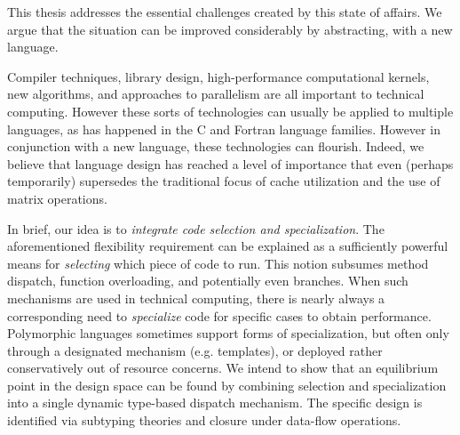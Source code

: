 

This thesis addresses the essential challenges created by
this state of affairs.
We argue that the situation   
can be improved considerably by
abstracting, with a new language.

Compiler techniques, library design, high-performance
computational kernels, new algorithms, and approaches to parallelism are
all important to technical computing.
However these sorts of technologies can usually be applied to multiple
languages, as has happened in the C and Fortran language families.
However in conjunction with a new language, these technologies can flourish.
Indeed, we believe that language design
has reached a level of importance that even (perhaps temporarily) supersedes
the traditional focus of cache utilization and the use of matrix operations.



In brief, our idea is to \emph{integrate code selection and specialization}.
The aforementioned flexibility requirement can be explained as
a sufficiently powerful means for \emph{selecting} which piece of code
to run.
This notion subsumes method dispatch, function overloading,
and potentially even branches.
When such mechanisms are used in technical computing, there is nearly
always a corresponding need to \emph{specialize} code for specific cases
to obtain performance.
Polymorphic languages sometimes support forms of specialization,
but often only through a designated mechanism (e.g. templates), or
deployed rather conservatively out of resource concerns.
We intend to show that an equilibrium point in the design space can be found
by combining selection and specialization into a single dynamic type-based
dispatch mechanism.
The specific design is identified via subtyping theories and closure under
data-flow operations.

